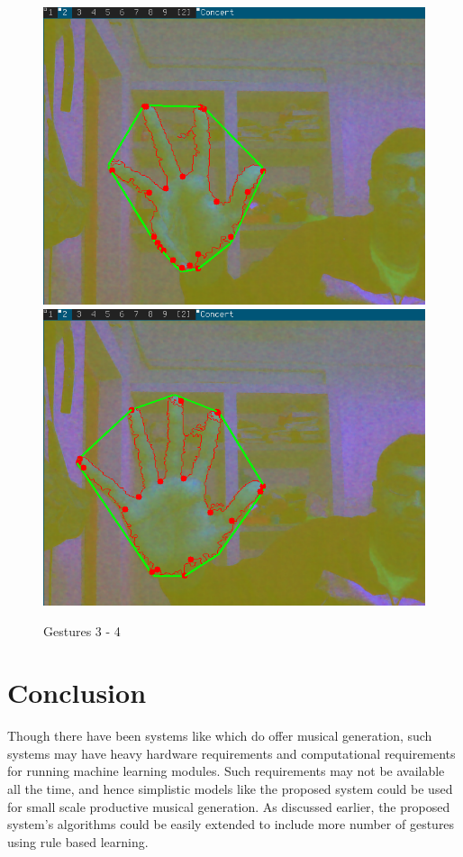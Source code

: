 \documentclass[letterpaper, 10 pt, twoside, conference]{ieeeconf}
\begin{document}
\begin{figure}[h!]
  \centering
  \includegraphics[width=0.4\columnwidth]{ges3.png}
  \includegraphics[width=0.4\columnwidth]{ges4.png}
  \caption{Gestures 3 - 4}
  \label{Overall1}
\end{figure}

\section{Conclusion}
Though there have been systems like \cite{zatlab} which do offer musical generation,
such systems may have heavy hardware requirements and computational requirements
for running machine learning modules. Such requirements may not be available all the time,
and hence simplistic models like the proposed system could be used for small scale productive
musical generation. As discussed earlier, the proposed system's algorithms could be
easily extended to include more number of gestures using rule based learning.



\end{document}

